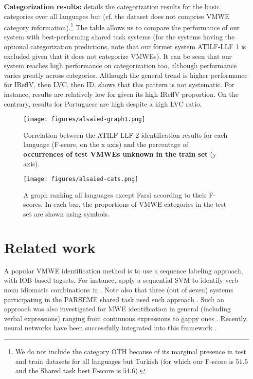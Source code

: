 \documentclass[output=paper,modfonts]{langscibook}
\begin{document}
\textbf{Categorization results: } details the categorization results for the basic categories over all languages but  (cf. the  dataset does not comprise VMWE category information).\footnote{We do not include the category OTH because of its marginal presence in test and train datasets for all languages but Turkish (for which our F-score is $51.5$ and the Shared task best F-score is $54.6$).} The table allows us to compare the performance of our system with best-performing shared task systems (for the systems having the optional categorization predictions, note that our former system ATILF-LLF 1 is excluded given that it does not categorize VMWEs). It can be seen that our system reaches high performance on categorization too, although performance varies greatly across categories. Although the general trend is higher performance for IReflV, then LVC, then ID,  shows that this pattern is not systematic. For instance, results are relatively low for  given its high IReflV proportion. On the contrary, results for Portuguese are high despite a high LVC ratio.
\begin{figure}
\texttt{[image: figures/alsaied-graph1.png]}
\caption{Correlation between the ATILF-LLF 2 identification results for each language (F-score, on the x axis) and the percentage of \textbf{occurrences of test VMWEs unknown in the train set} (y axis).}
\label{fig:correlation}
\end{figure}
\begin{figure}
\texttt{[image: figures/alsaied-cats.png]}
\caption{A graph ranking all languages except Farsi according to their F-scores. In each bar, the proportions of VMWE categories in the test set are shown using symbols.}
\label{fig:cats}
\end{figure}
\section{Related work}
A popular VMWE identification method is to use a sequence labeling approach, with IOB-based tagsets. For instance, \citet{diab-bhutada:2009:MWE09} apply a sequential SVM to identify verb-noun idiomatic combinations in . Note also that three (out of seven) systems participating in the PARSEME shared task used such approach \citep{borocs2017,maldonado2017,W17-1707}.
Such an approach was also investigated for MWE identification in general (including verbal expressions) ranging from continuous expressions \citep{blunsom-baldwin:2006:EMNLP} to gappy ones \citep{Schneider14b}. Recently, neural networks have been successfully integrated into this framework \citep{legrand2016phrase,W17-1707}. 
\end{document}
